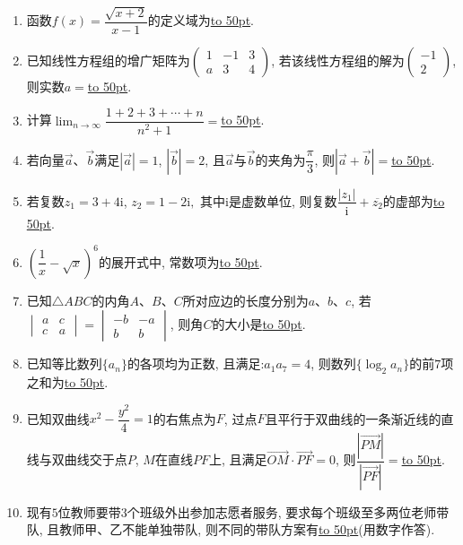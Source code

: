 \documentclass[10pt,a4paper]{article}
\newcommand{\blank}[1]{\underline{\hbox to #1pt{}}}
\begin{document}
\begin{enumerate}[1.]

\item 函数$f(x)=\dfrac{\sqrt{x+2}}{x-1}$的定义域为\blank{50}.
\item 已知线性方程组的增广矩阵为$\begin{pmatrix} 1 & -1  & 3  \\ a & 3 & 4 \end{pmatrix}$, 若该线性方程组的解为$\begin{pmatrix} -1 \\ 2\end{pmatrix}$, 则实数$a=$\blank{50}.
\item 计算$\displaystyle\lim_{n\to\infty}\dfrac{1+2+3+\cdots +n}{n^2+1}=$\blank{50}.
\item 若向量$\overrightarrow a$、$\overrightarrow b$满足$|\overrightarrow a|=1$, $|\overrightarrow b|=2$, 且$\overrightarrow a$与$\overrightarrow b$的夹角为$\dfrac{\pi}3$, 则$|\overrightarrow a+\overrightarrow b|=$\blank{50}.
\item 若复数$z_1=3+4\mathrm{i}$, $z_2=1-2\mathrm{i},$ 其中$\mathrm{i}$是虚数单位, 则复数$\dfrac{|z_1|}{\mathrm{i}}+\overline{z_2}$的虚部为\blank{50}.
\item $(\dfrac1x-\sqrt x)^6$的展开式中, 常数项为\blank{50}.
\item 已知$\triangle  ABC$的内角$A$、$B$、$C$所对应边的长度分别为$a$、$b$、$c$, 若$\begin{vmatrix}a & c \\ c & a\end{vmatrix} = \begin{vmatrix}-b & -a \\ b & b\end{vmatrix}$, 则角$C$的大小是\blank{50}.
\item 已知等比数列$\{a_n\}$的各项均为正数, 且满足:$a_1a_7=4$, 则数列$\{\log_2a_n\}$的前$7$项之和为\blank{50}.
\item 已知双曲线$x^2-\dfrac{y^2}4=1$的右焦点为$F$, 过点$F$且平行于双曲线的一条渐近线的直线与双曲线交于点$P$, $M$在直线$PF$上, 且满足$\overrightarrow{OM}\cdot \overrightarrow{PF}=0$, 则$\dfrac{|\overrightarrow{PM}|}{|\overrightarrow{PF}|}=$\blank{50}.
\item 现有$5$位教师要带$3$个班级外出参加志愿者服务, 要求每个班级至多两位老师带队, 且教师甲、乙不能单独带队, 则不同的带队方案有\blank{50}(用数字作答).



\end{enumerate}
\end{document}
